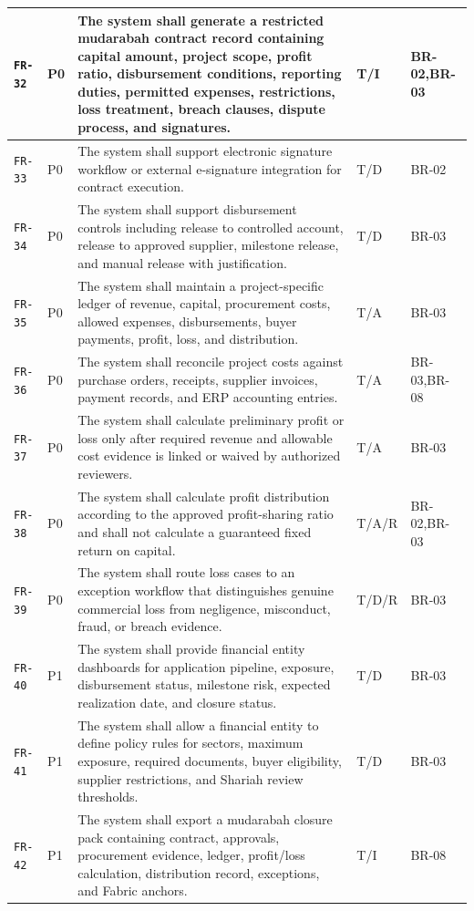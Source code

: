 \documentclass[11pt,a4paper]{article}
\begin{document}
\begin{footnotesize}
\begin{longtable}{@{}p{}p{}p{}p{}p{}@{}}
\texttt{FR-32} & P0 & The system shall generate a restricted mudarabah contract record containing capital amount, project scope, profit ratio, disbursement conditions, reporting duties, permitted expenses, restrictions, loss treatment, breach clauses, dispute process, and signatures. & T/I & BR-02,BR-03 \\ \hline
\texttt{FR-33} & P0 & The system shall support electronic signature workflow or external e-signature integration for contract execution. & T/D & BR-02 \\ \hline
\texttt{FR-34} & P0 & The system shall support disbursement controls including release to controlled account, release to approved supplier, milestone release, and manual release with justification. & T/D & BR-03 \\ \hline
\texttt{FR-35} & P0 & The system shall maintain a project-specific ledger of revenue, capital, procurement costs, allowed expenses, disbursements, buyer payments, profit, loss, and distribution. & T/A & BR-03 \\ \hline
\texttt{FR-36} & P0 & The system shall reconcile project costs against purchase orders, receipts, supplier invoices, payment records, and ERP accounting entries. & T/A & BR-03,BR-08 \\ \hline
\texttt{FR-37} & P0 & The system shall calculate preliminary profit or loss only after required revenue and allowable cost evidence is linked or waived by authorized reviewers. & T/A & BR-03 \\ \hline
\texttt{FR-38} & P0 & The system shall calculate profit distribution according to the approved profit-sharing ratio and shall not calculate a guaranteed fixed return on capital. & T/A/R & BR-02,BR-03 \\ \hline
\texttt{FR-39} & P0 & The system shall route loss cases to an exception workflow that distinguishes genuine commercial loss from negligence, misconduct, fraud, or breach evidence. & T/D/R & BR-03 \\ \hline
\texttt{FR-40} & P1 & The system shall provide financial entity dashboards for application pipeline, exposure, disbursement status, milestone risk, expected realization date, and closure status. & T/D & BR-03 \\ \hline
\texttt{FR-41} & P1 & The system shall allow a financial entity to define policy rules for sectors, maximum exposure, required documents, buyer eligibility, supplier restrictions, and Shariah review thresholds. & T/D & BR-03 \\ \hline
\texttt{FR-42} & P1 & The system shall export a mudarabah closure pack containing contract, approvals, procurement evidence, ledger, profit/loss calculation, distribution record, exceptions, and Fabric anchors. & T/I & BR-08 \\ \hline
\end{longtable}
\end{footnotesize}
\end{document}
